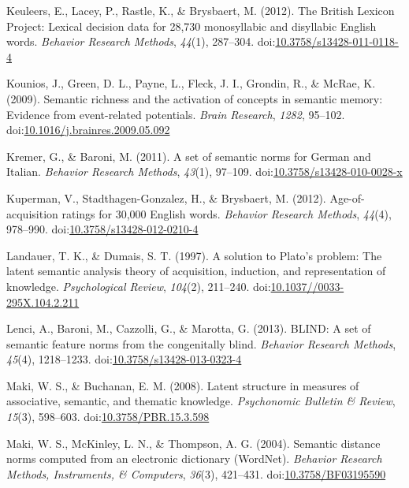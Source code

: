 \documentclass[english,,man]{apa6}
\theoremstyle{definition}
\theoremstyle{definition}
\theoremstyle{definition}
\theoremstyle{remark}
\begin{document}
\leavevmode\hypertarget{ref-Keuleers2012}{}%
Keuleers, E., Lacey, P., Rastle, K., \& Brysbaert, M. (2012). The
British Lexicon Project: Lexical decision data for 28,730 monosyllabic
and disyllabic English words. \emph{Behavior Research Methods},
\emph{44}(1), 287--304.
doi:\href{https://doi.org/10.3758/s13428-011-0118-4}{10.3758/s13428-011-0118-4}

\leavevmode\hypertarget{ref-Kounios2009}{}%
Kounios, J., Green, D. L., Payne, L., Fleck, J. I., Grondin, R., \&
McRae, K. (2009). Semantic richness and the activation of concepts in
semantic memory: Evidence from event-related potentials. \emph{Brain
Research}, \emph{1282}, 95--102.
doi:\href{https://doi.org/10.1016/j.brainres.2009.05.092}{10.1016/j.brainres.2009.05.092}

\leavevmode\hypertarget{ref-Kremer2011a}{}%
Kremer, G., \& Baroni, M. (2011). A set of semantic norms for German and
Italian. \emph{Behavior Research Methods}, \emph{43}(1), 97--109.
doi:\href{https://doi.org/10.3758/s13428-010-0028-x}{10.3758/s13428-010-0028-x}

\leavevmode\hypertarget{ref-Kuperman2012}{}%
Kuperman, V., Stadthagen-Gonzalez, H., \& Brysbaert, M. (2012).
Age-of-acquisition ratings for 30,000 English words. \emph{Behavior
Research Methods}, \emph{44}(4), 978--990.
doi:\href{https://doi.org/10.3758/s13428-012-0210-4}{10.3758/s13428-012-0210-4}

\leavevmode\hypertarget{ref-Landauer1997}{}%
Landauer, T. K., \& Dumais, S. T. (1997). A solution to Plato's problem:
The latent semantic analysis theory of acquisition, induction, and
representation of knowledge. \emph{Psychological Review}, \emph{104}(2),
211--240.
doi:\href{https://doi.org/10.1037//0033-295X.104.2.211}{10.1037//0033-295X.104.2.211}

\leavevmode\hypertarget{ref-Lenci2013}{}%
Lenci, A., Baroni, M., Cazzolli, G., \& Marotta, G. (2013). BLIND: A set
of semantic feature norms from the congenitally blind. \emph{Behavior
Research Methods}, \emph{45}(4), 1218--1233.
doi:\href{https://doi.org/10.3758/s13428-013-0323-4}{10.3758/s13428-013-0323-4}

\leavevmode\hypertarget{ref-Maki2008}{}%
Maki, W. S., \& Buchanan, E. M. (2008). Latent structure in measures of
associative, semantic, and thematic knowledge. \emph{Psychonomic
Bulletin \& Review}, \emph{15}(3), 598--603.
doi:\href{https://doi.org/10.3758/PBR.15.3.598}{10.3758/PBR.15.3.598}

\leavevmode\hypertarget{ref-Maki2004}{}%
Maki, W. S., McKinley, L. N., \& Thompson, A. G. (2004). Semantic
distance norms computed from an electronic dictionary (WordNet).
\emph{Behavior Research Methods, Instruments, \& Computers},
\emph{36}(3), 421--431.
doi:\href{https://doi.org/10.3758/BF03195590}{10.3758/BF03195590}
\end{document}
